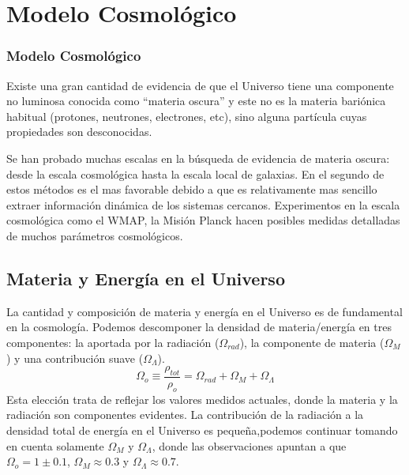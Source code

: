 \documentclass{beamer}
\begin{document}
\section{Modelo Cosmológico}
	\begin{frame}
		\frametitle{Modelo Cosmológico}
		Existe una gran cantidad de evidencia de que el Universo tiene una componente no luminosa conocida como ``materia oscura'' y este no es la materia bariónica habitual (protones, neutrones, electrones, etc), sino alguna partícula cuyas propiedades son desconocidas.

Se han probado muchas escalas en la búsqueda de evidencia de materia oscura: desde la escala cosmológica hasta la escala local de galaxias. En el segundo de estos métodos es el mas favorable debido a que es relativamente mas sencillo extraer información dinámica de los sistemas cercanos. Experimentos en la escala cosmológica como el WMAP, la Misión Planck hacen posibles medidas detalladas de muchos parámetros cosmológicos.

	\end{frame}

\subsection{Materia y Energía en el Universo}
	\begin{frame}
		La cantidad y composición de materia y energía en el Universo es de fundamental en la cosmología. Podemos descomponer la densidad de materia/energía en tres componentes: la aportada por la radiación ($\Omega_{rad}$), la componente de materia ($\Omega_{M}$) y una contribución suave ($\Omega_{\Lambda}$).		
		\begin{equation}
			\Omega_o \equiv \frac{\rho_{tot}}{\rho_o} = \Omega_{rad} + \Omega_M + \Omega_{\Lambda}
		\end{equation}
Esta elección trata de reflejar los valores medidos actuales, donde la materia y la radiación son componentes evidentes. La contribución de la radiación a la densidad total de energía en el Universo es pequeña,podemos continuar tomando en cuenta solamente $\Omega_{M}$ y $\Omega_{\Lambda}$, donde las observaciones apuntan a que $\Omega_{o}=1\pm 0.1$, $\Omega_{M}\approx 0.3$ y $\Omega_{\Lambda}\approx 0.7$.
	\end{frame}
	
\end{document}
